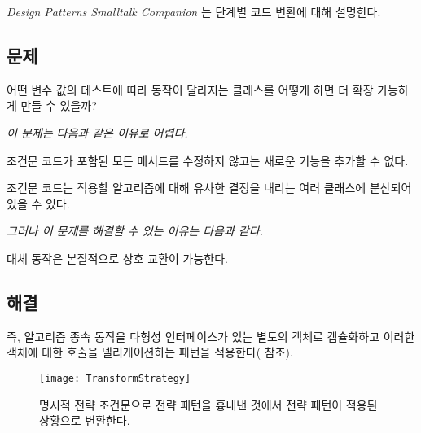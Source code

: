 \documentclass[a4paper,10pt,twoside]{book}
\begin{document}
\emph{Design Patterns Smalltalk Companion} \cite{Alpe98a}는 단계별 코드 변환에 대해 설명한다.

  

\subsection*{문제}

어떤 변수 값의 테스트에 따라 동작이 달라지는 클래스를 어떻게 하면 더 확장 가능하게 만들 수 있을까?

\emph{이 문제는 다음과 같은 이유로 어렵다.}

\begin{bulletlist}
\item 조건문 코드가 포함된 모든 메서드를 수정하지 않고는 새로운 기능을 추가할 수 없다. 

\item 조건문 코드는 적용할 알고리즘에 대해 유사한 결정을 내리는 여러 클래스에 분산되어 있을 수 있다.
\end{bulletlist}

\emph{그러나 이 문제를 해결할 수 있는 이유는 다음과 같다.}

\begin{bulletlist}
\item 대체 동작은 본질적으로 상호 교환이 가능한다.
\end{bulletlist}

\subsection*{해결}

즉, 알고리즘 종속 동작을 다형성 인터페이스가 있는 별도의 객체로 캡슐화하고 이러한 객체에 대한 호출을 델리게이션하는  패턴을 적용한다( 참조). 

\begin{figure}[h]
\begin{center}
\texttt{[image: TransformStrategy]}
\caption{명시적 전략 조건문으로 전략 패턴을 흉내낸 것에서 전략 패턴이 적용된 상황으로 변환한다.}
\end{center}
\end{figure}
\end{document}
